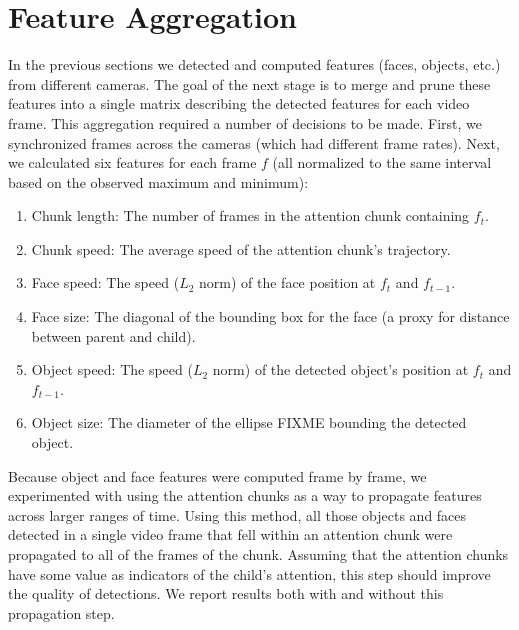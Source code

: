 \documentclass[10pt,letterpaper]{article}
\begin{document}
\section{Feature Aggregation}

In the previous sections we detected and computed features (faces, objects, etc.) from different cameras. The goal of the next stage is to merge and prune these features into a single matrix describing the detected features for each video frame. This aggregation required a number of decisions to be made. First, we synchronized frames across the cameras (which had different frame rates). Next, we calculated six features for each frame $f$ (all normalized to the same interval based on the observed maximum and minimum): 


\begin{enumerate}[noitemsep]
\item Chunk length: The number of frames in the attention chunk containing $f_{t}$.
\item Chunk speed: The average speed of the attention chunk's trajectory. 
\item Face speed: The speed ($L_{2}$ norm) of the face position at $f_t$ and $f_{t-1}$. 
\item Face size: The diagonal of the bounding box for the face (a proxy for distance between parent and child).
\item  Object speed: The speed ($L_{2}$ norm) of the detected object's position at $f_t$ and $f_{t-1}$.    
\item Object size: The diameter of the ellipse FIXME bounding the detected object.
\end{enumerate}

Because object and face features were computed frame by frame, we experimented with using the attention chunks as a way to propagate features across larger ranges of time. Using this method, all those objects and faces detected in a single video frame that fell within an attention chunk were propagated to all of the frames of the chunk. Assuming that the attention chunks have some value as indicators of the child's attention, this step should improve the quality of detections. We report results both with and without this propagation step. 
\end{document}

